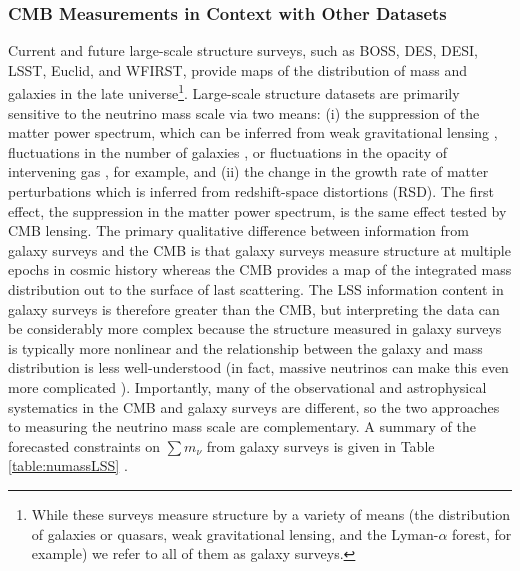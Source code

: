 \subsubsection{CMB Measurements in Context with Other Datasets}
\label{sssec:mnuexternal}
Current and future large-scale structure surveys, such as BOSS, DES, DESI, LSST, Euclid, and WFIRST, provide maps of the distribution of mass and galaxies in the late universe\footnote{While these surveys measure structure by a variety of means (the distribution of galaxies or quasars, weak gravitational lensing, and the Lyman-$\alpha$ forest, for example) we refer to all of them as galaxy surveys.}. Large-scale structure datasets are primarily sensitive to the neutrino mass scale via two means: (i) the suppression of the matter power spectrum, which can be inferred from weak gravitational lensing \cite{Tereno:2008mm}, fluctuations in the number of galaxies \cite{Xia:2012na, Cuesta:2015iho}, or fluctuations in the opacity of intervening gas \cite{Palanque-Delabrouille:2014jca}, for example, and (ii) the change in the growth rate of matter perturbations which is inferred from redshift-space distortions (RSD)\cite{Beutler:2014yhv}. The first effect, the suppression in the matter power spectrum, is the same effect tested by CMB lensing.  The primary qualitative difference between information from galaxy surveys and the CMB is that galaxy surveys measure structure at multiple epochs in cosmic history whereas the CMB provides a map of the integrated mass distribution out to the surface of last scattering. The LSS information content in galaxy surveys is therefore greater than the CMB, but interpreting the data can be considerably more complex because the structure measured in galaxy surveys is typically more nonlinear and the relationship between the galaxy and mass distribution is less well-understood (in fact, massive neutrinos can make this even more complicated \cite{LoVerde:2014pxa}). Importantly, many of the observational and astrophysical systematics in the CMB and galaxy surveys are different, so the two approaches to measuring the neutrino mass scale are complementary. A summary of the forecasted constraints on $\sum m_\nu$ from galaxy surveys is given in Table \ref{table:numassLSS} \cite{Font-Ribera:2013rwa}. 
